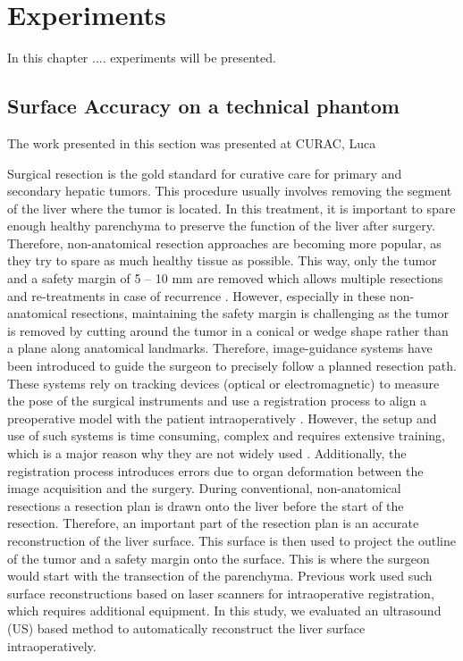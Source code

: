 \chapter{Experiments}
In this chapter .... experiments will be presented. 
\section{Surface Accuracy on a technical phantom}
\label{sec:SurfaceReconstructionAccuracy}
The work presented in this section was presented at CURAC, Luca

Surgical resection is the gold standard for curative care for primary and
secondary hepatic tumors. This procedure usually involves removing the segment
of the liver where the tumor is located. In this treatment, it is important to
spare enough healthy parenchyma to preserve the function of the liver after
surgery. Therefore, non-anatomical resection approaches are becoming more
popular, as they try to spare as much healthy tissue as possible. This way, only
the tumor and a safety margin of 5 – 10 mm are removed which allows multiple
resections and re-treatments in case of recurrence \cite{aghayan2018laparoscopic}.
However, especially in these non-anatomical resections, maintaining the safety
margin is challenging as the tumor is removed by cutting around the tumor in a
conical or wedge shape rather than a plane along anatomical landmarks.
Therefore, image-guidance systems have been introduced to guide the surgeon to
precisely follow a planned resection path. These systems rely on tracking
devices (optical or electromagnetic) to measure the pose of the surgical
instruments and use a registration process to align a preoperative model with
the patient intraoperatively \cite{lango2012navigated}\cite{banz2016intraoperative}. However, the setup and use of such systems
is time consuming, complex and requires extensive training, which is a major
reason why they are not widely used \cite{kingham2013evolution}.
Additionally, the registration process introduces errors due to organ deformation between the image acquisition and the surgery. 
During conventional, non-anatomical resections a resection plan is drawn onto
the liver before the start of the resection. Therefore, an important part of the
resection plan is an accurate reconstruction of the liver surface. This surface
is then used to project the outline of the tumor and a safety margin onto the
surface.
This is where the surgeon would start with the transection of the parenchyma.
Previous work used such surface reconstructions based on laser scanners \cite{simpson2016current} for
intraoperative registration, which requires additional equipment.
In this study, we evaluated an ultrasound (US) based method to automatically reconstruct the liver surface intraoperatively.


